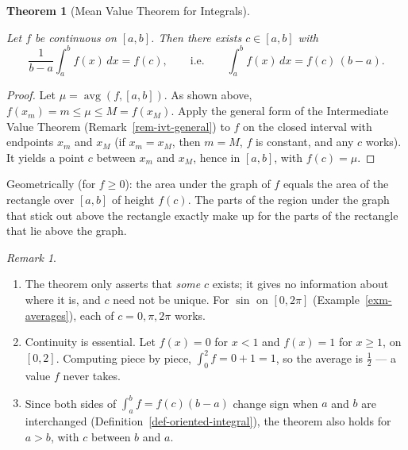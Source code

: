 \documentclass[
  letterpaper,
  DIV=11,
  numbers=noendperiod]{scrreprt}
\providecommand{\tightlist}{%
  \setlength{\itemsep}{0pt}\setlength{\parskip}{0pt}}
\theoremstyle{plain}
\theoremstyle{plain}
\theoremstyle{definition}
\theoremstyle{definition}
\theoremstyle{definition}
\theoremstyle{plain}
\newtheorem{theorem}{Theorem}[chapter]
\theoremstyle{plain}
\theoremstyle{remark}
\newtheorem{refremark}{Remark}[chapter]
\begin{document}
\begin{theorem}[Mean Value Theorem for
Integrals]\protect\hypertarget{thm-mvt-integrals}{}\label{thm-mvt-integrals}

Let \(f\) be continuous on \([a,b]\). Then there exists \(c\in[a,b]\)
with \[
\frac1{b-a}\int_a^b f(x)\,dx = f(c),
\qquad\text{i.e.}\qquad
\int_a^b f(x)\,dx = f(c)\,(b-a).
\]

\end{theorem}

\begin{proof}
Let \(\mu = \operatorname{avg}(f,[a,b])\). As shown above,
\(f(x_m)=m\le\mu\le M=f(x_M)\). Apply the general form of the
Intermediate Value Theorem (Remark~\ref{rem-ivt-general}) to \(f\) on
the closed interval with endpoints \(x_m\) and \(x_M\) (if \(x_m=x_M\),
then \(m=M\), \(f\) is constant, and any \(c\) works). It yields a point
\(c\) between \(x_m\) and \(x_M\), hence in \([a,b]\), with
\(f(c)=\mu\).
\end{proof}

Geometrically (for \(f\ge0\)): the area under the graph of \(f\) equals
the area of the rectangle over \([a,b]\) of height \(f(c)\). The parts
of the region under the graph that stick out above the rectangle exactly
make up for the parts of the rectangle that lie above the graph.

\begin{refremark}
\leavevmode

\begin{enumerate}
\def\labelenumi{\arabic{enumi}.}
\tightlist
\item
  The theorem only asserts that \emph{some} \(c\) exists; it gives no
  information about where it is, and \(c\) need not be unique. For
  \(\sin\) on \([0,2\pi]\) (Example~\ref{exm-averages}), each of
  \(c=0,\pi,2\pi\) works.
\item
  Continuity is essential. Let \(f(x)=0\) for \(x<1\) and \(f(x)=1\) for
  \(x\ge1\), on \([0,2]\). Computing piece by piece,
  \(\int_0^2 f = 0 + 1 = 1\), so the average is \(\frac12\) --- a value
  \(f\) never takes.
\item
  Since both sides of \(\int_a^b f = f(c)(b-a)\) change sign when \(a\)
  and \(b\) are interchanged (Definition~\ref{def-oriented-integral}),
  the theorem also holds for \(a>b\), with \(c\) between \(b\) and
  \(a\).
\end{enumerate}

\label{rem-mvt-remarks}

\end{refremark}
\end{document}
